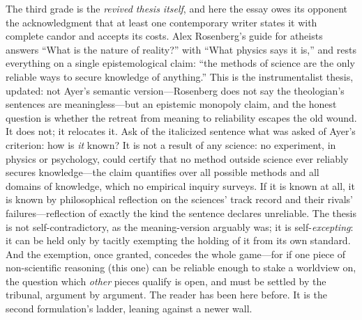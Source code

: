 The third grade is the \emph{revived thesis itself}, and here the essay owes its opponent the acknowledgment that at least one contemporary writer states it with complete candor and accepts its costs. Alex Rosenberg's guide for atheists answers ``What is the nature of reality?'' with ``What physics says it is,'' and rests everything on a single epistemological claim: ``the methods of science are the only reliable ways to secure knowledge of anything.'' This is the instrumentalist thesis, updated: not Ayer's semantic version---Rosenberg does not say the theologian's sentences are meaningless---but an epistemic monopoly claim, and the honest question is whether the retreat from meaning to reliability escapes the old wound. It does not; it relocates it. Ask of the italicized sentence what was asked of Ayer's criterion: how is \emph{it} known? It is not a result of any science: no experiment, in physics or psychology, could certify that no method outside science ever reliably secures knowledge---the claim quantifies over all possible methods and all domains of knowledge, which no empirical inquiry surveys. If it is known at all, it is known by philosophical reflection on the sciences' track record and their rivals' failures---reflection of exactly the kind the sentence declares unreliable. The thesis is not self-contradictory, as the meaning-version arguably was; it is self-\emph{excepting}: it can be held only by tacitly exempting the holding of it from its own standard. And the exemption, once granted, concedes the whole game---for if one piece of non-scientific reasoning (this one) can be reliable enough to stake a worldview on, the question which \emph{other} pieces qualify is open, and must be settled by the tribunal, argument by argument. The reader has been here before. It is the second formulation's ladder, leaning against a newer wall.

